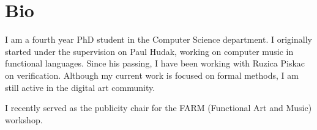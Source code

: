 \section{Bio}

I am a fourth year PhD student in the Computer Science department.
I originally started under the supervision on Paul Hudak, working on computer music in functional languages.
Since his passing, I have been working with Ruzica Piskac on verification.
Although my current work is focused on formal methods, I am still active in the digital art community.

I recently served as the publicity chair for the FARM (Functional Art and Music) workshop.
